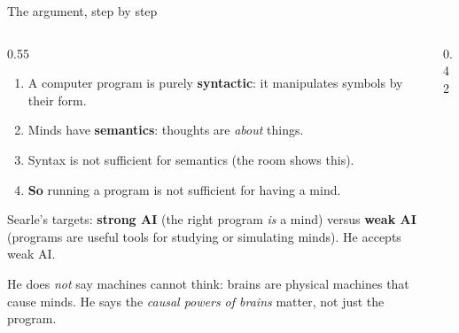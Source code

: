\begin{frame}{The argument, step by step}
\begin{columns}[T]
\begin{column}{0.55\textwidth}
\small
\begin{enumerate}\setlength\itemsep{4pt}
\item A computer program is purely \textbf{syntactic}: it manipulates symbols by their form.
\item Minds have \textbf{semantics}: thoughts are \emph{about} things.
\item Syntax is not sufficient for semantics (the room shows this).
\item \textbf{So} running a program is not sufficient for having a mind.
\end{enumerate}
\vspace{1mm}
Searle's targets: \textbf{strong AI} (the right program \emph{is} a mind) versus \textbf{weak AI} (programs are useful tools for studying or simulating minds). He accepts weak AI.

{\footnotesize He does \emph{not} say machines cannot think: brains are physical machines that cause minds. He says the \emph{causal powers of brains} matter, not just the program.}
\end{column}
\begin{column}{0.42\textwidth}
\begin{sfig}[0.6]
\end{sfig}
\end{column}
\end{columns}
\end{frame}

